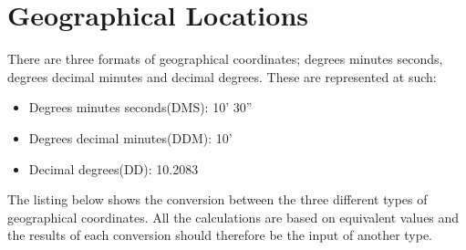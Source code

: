 \section{Geographical Locations} \label{sec:geo_coordinates}
There are three formats of geographical coordinates; degrees minutes seconds, degrees decimal minutes and decimal degrees. These are represented at such:
\begin{itemize}
	\item Degrees minutes seconds(DMS): 10' 30''
	\item Degrees decimal minutes(DDM): 10'
	\item Decimal degrees(DD): 10.2083\degree
\end{itemize}

The listing below shows the conversion between the three different types of geographical coordinates. All the calculations are based on equivalent values and the results of each conversion should therefore be the input of another type.



